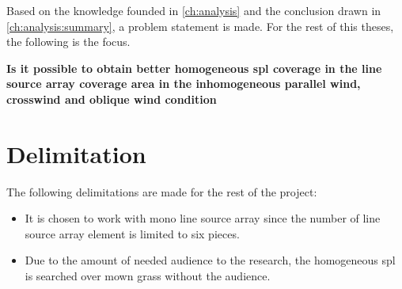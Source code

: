 Based on the knowledge founded in \autoref{ch:analysis} and the conclusion drawn in \autoref{ch:analysis:summary}, a problem statement is made. For the rest of this theses, the following is the focus.


\textbf{Is it possible to obtain better homogeneous \gls{spl} coverage in the line source array coverage area in the inhomogeneous parallel wind, crosswind and oblique wind condition}



\section{Delimitation}
The following delimitations are made for the rest of the project:

\begin{itemize}
\item It is chosen to work with mono line source array since the number of line source array element is limited to six pieces.
\item Due to the amount of needed audience to the research, the homogeneous \gls{spl} is searched over mown grass without the audience.
\end{itemize}
